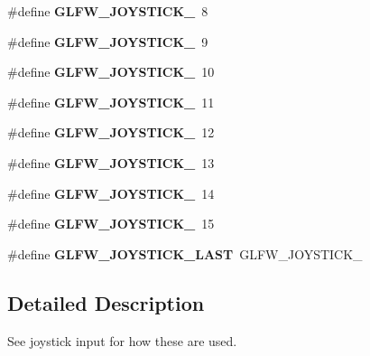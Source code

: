\begin{DoxyCompactItemize}
\#define {\bfseries G\+L\+F\+W\+\_\+\+J\+O\+Y\+S\+T\+I\+C\+K\+\_}~8
\item 
\mbox{\label{group__joysticks_gaef55389ee605d6dfc31aef6fe98c54ec}} 
\#define {\bfseries G\+L\+F\+W\+\_\+\+J\+O\+Y\+S\+T\+I\+C\+K\+\_}~9
\item 
\mbox{\label{group__joysticks_gae7d26e3df447c2c14a569fcc18516af4}} 
\#define {\bfseries G\+L\+F\+W\+\_\+\+J\+O\+Y\+S\+T\+I\+C\+K\+\_}~10
\item 
\mbox{\label{group__joysticks_gab91bbf5b7ca6be8d3ac5c4d89ff48ac7}} 
\#define {\bfseries G\+L\+F\+W\+\_\+\+J\+O\+Y\+S\+T\+I\+C\+K\+\_}~11
\item 
\mbox{\label{group__joysticks_ga5c84fb4e49bf661d7d7c78eb4018c508}} 
\#define {\bfseries G\+L\+F\+W\+\_\+\+J\+O\+Y\+S\+T\+I\+C\+K\+\_}~12
\item 
\mbox{\label{group__joysticks_ga89540873278ae5a42b3e70d64164dc74}} 
\#define {\bfseries G\+L\+F\+W\+\_\+\+J\+O\+Y\+S\+T\+I\+C\+K\+\_}~13
\item 
\mbox{\label{group__joysticks_ga7b02ab70daf7a78bcc942d5d4cc1dcf9}} 
\#define {\bfseries G\+L\+F\+W\+\_\+\+J\+O\+Y\+S\+T\+I\+C\+K\+\_}~14
\item 
\mbox{\label{group__joysticks_ga453edeeabf350827646b6857df4f80ce}} 
\#define {\bfseries G\+L\+F\+W\+\_\+\+J\+O\+Y\+S\+T\+I\+C\+K\+\_}~15
\item 
\mbox{\label{group__joysticks_ga9ca13ebf24c331dd98df17d84a4b72c9}} 
\#define {\bfseries G\+L\+F\+W\+\_\+\+J\+O\+Y\+S\+T\+I\+C\+K\+\_\+\+L\+A\+ST}~G\+L\+F\+W\+\_\+\+J\+O\+Y\+S\+T\+I\+C\+K\+\_
\end{DoxyCompactItemize}


\subsection{Detailed Description}
See joystick input for how these are used. 